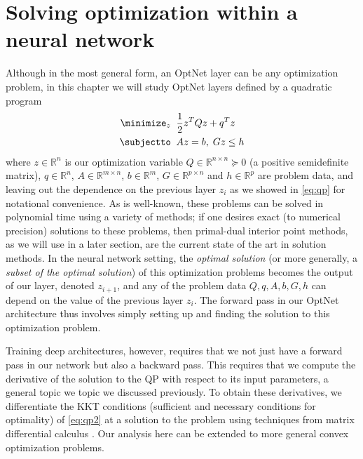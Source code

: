 \section{Solving optimization within a neural network}
\label{sec:optnet:formulation}
Although in the most general form, an OptNet layer can be any
optimization problem, in this chapter we will study OptNet layers defined by a
quadratic program
\begin{equation}
\begin{split}
\minimize_{z} \;\; & \frac{1} {2}z^T Q z + q^T z \\
\subjectto \;\; & A z = b, \; G z \leq h
\end{split}
\label{eq:qp2}
\end{equation}
where $z \in \mathbb{R}^n$ is our optimization variable
$Q \in \mathbb {R}^{n \times n} \succeq 0$
(a positive semidefinite matrix),
$q \in \mathbb {R}^n$, $A\in \mathbb{R}^{m \times n}$,
$b \in \mathbb{R}^m$,
$G \in \mathbb{R}^ {p \times n}$ and
$h \in \mathbb{R}^{p}$ are problem data,
and leaving out the dependence on the
previous layer $z_i$ as we showed in \eqref{eq:qp}
for notational convenience.
As is well-known,
these problems can be solved in polynomial time using a variety of methods; if
one desires exact (to numerical precision) solutions to these problems, then
primal-dual interior point methods, as we will use in a later section, are the
current state of the art in solution methods.
In the neural network setting, the \emph{optimal solution} (or more generally,
a \emph{subset of the optimal solution}) of this optimization problems becomes
the output of our layer, denoted $z_{i+1}$, and any of the problem data
$Q, q, A, b, G, h$
can depend on the value of the previous layer $z_i$.
The forward pass in our OptNet architecture thus involves simply setting up
and finding the solution to this optimization problem.

Training deep architectures, however, requires that we not just have a forward
pass in our network but also a backward pass. This requires that we compute the
derivative of the solution to the QP with respect to its input parameters,
a general topic we topic we discussed previously.
To obtain these derivatives, we differentiate the KKT conditions
(sufficient and necessary conditions for optimality) of \eqref{eq:qp2} at a
solution to the problem using techniques
from matrix differential calculus \citep{magnus1988matrix}.
Our analysis here can be extended to
more general convex optimization problems.

